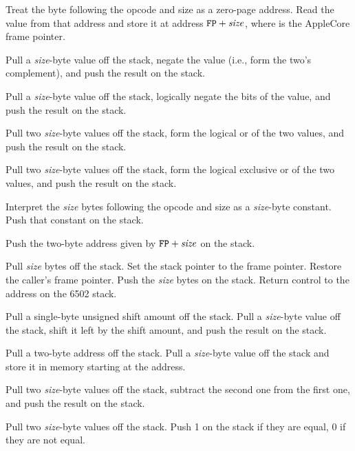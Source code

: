 \documentclass[10pt]{article}
\begin{document}
Treat the byte following the opcode and size as a zero-page
address.  Read the value from that address and store it
at address $\texttt{FP}+\mbox{\textit{size}}$, where  is the
AppleCore frame pointer.

 Pull a \emph{size}-byte
value off the stack, negate the value (i.e., form the two's
complement), and push the result on the stack.

 Pull a \emph{size}-byte value
off the stack, logically negate the bits of the value, and push the
result on the stack.

 Pull two
\emph{size}-byte values off the stack, form the logical or of the two
values, and push the result on the stack.

 Pull two
\emph{size}-byte values off the stack, form the logical exclusive or
of the two values, and push the result on the stack.

Interpret the \emph{size} bytes following the opcode and size
as a \emph{size}-byte constant.  Push that constant on the
stack.

Push the two-byte address given by $\texttt{FP}+\mbox{\textit{size}}$ on
the stack.

Pull \emph{size} bytes off the stack.  Set the stack pointer to the
frame pointer.  Restore the caller's frame pointer.  Push the
\emph{size} bytes on the stack.  Return control to the address on the
6502 stack.

 Pull a single-byte
unsigned shift amount off the stack.  Pull a \emph{size}-byte value
off the stack, shift it left by the shift amount, and push the result
on the stack.

Pull a two-byte address off the stack.  Pull a \emph{size}-byte
value off the stack and store it in memory starting at the
address.

Pull two \emph{size}-byte values off the stack, subtract the
second one from the first one, and push the result on the stack.

Pull two \emph{size}-byte values off the stack. Push 1 on the stack
if they are equal, 0 if they are not equal.
\end{document}
